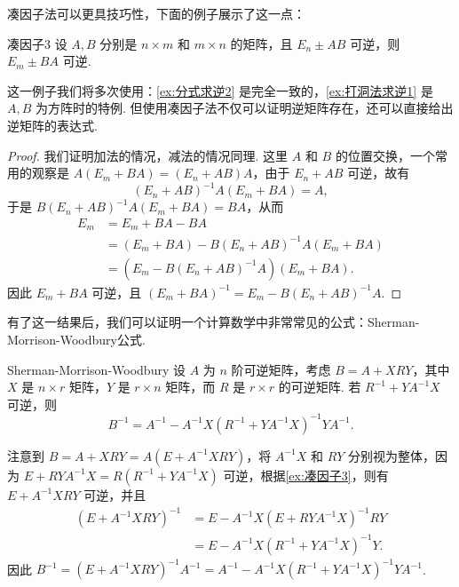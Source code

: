 凑因子法可以更具技巧性，下面的例子展示了这一点：

\begin{example}{}{凑因子3}
    设 $A, B$ 分别是 $n \times m$ 和 $m \times n$ 的矩阵，且 $E_n \pm AB$ 可逆，则 $E_m \pm BA$ 可逆.
\end{example}

这一例子我们将多次使用：\autoref{ex:分式求逆2} 是完全一致的，\autoref{ex:打洞法求逆1} 是 $A,B$ 为方阵时的特例. 但使用凑因子法不仅可以证明逆矩阵存在，还可以直接给出逆矩阵的表达式.

\begin{proof}
    我们证明加法的情况，减法的情况同理. 这里 $A$ 和 $B$ 的位置交换，一个常用的观察是 $A(E_m + BA) = (E_n + AB)A$，由于 $E_n + AB$ 可逆，故有
    \[(E_n + AB)^{-1}A(E_m + BA) = A,\]
    于是 $B(E_n + AB)^{-1}A(E_m + BA) = BA$，从而
    \begin{align*}
        E_m &= E_m + BA - BA \\
           & = (E_m + BA) - B(E_n + AB)^{-1}A(E_m + BA) \\
           & = (E_m - B(E_n + AB)^{-1}A)(E_m + BA).
    \end{align*}
    因此 $E_m + BA$ 可逆，且 $(E_m + BA)^{-1} = E_m - B(E_n + AB)^{-1}A$.
\end{proof}

有了这一结果后，我们可以证明一个计算数学中非常常见的公式：Sherman-Morrison-Woodbury公式.
\begin{example}{}{Sherman-Morrison-Woodbury}
    设 $A$ 为 $n$ 阶可逆矩阵，考虑 $B = A + XRY$，其中 $X$ 是 $n \times r$ 矩阵，$Y$ 是 $r \times n$ 矩阵，而 $R$ 是 $r \times r$ 的可逆矩阵. 若 $R^{-1} + YA^{-1}X$ 可逆，则
    \[B^{-1}=A^{-1}-A^{-1}X(R^{-1}+YA^{-1}X)^{-1}YA^{-1}.\]
\end{example}

\begin{solution}
    注意到 $B = A + XRY = A(E + A^{-1}XRY)$，将 $A^{-1}X$ 和 $RY$ 分别视为整体，因为 $E + RYA^{-1}X = R(R^{-1} + YA^{-1}X)$ 可逆，根据\autoref{ex:凑因子3}，则有 $E + A^{-1}XRY$ 可逆，并且
    \begin{align*}
        (E + A^{-1}XRY)^{-1} & = E - A^{-1}X(E + RYA^{-1}X)^{-1}RY \\
                             & = E - A^{-1}X(R^{-1} + YA^{-1}X)^{-1}Y.
    \end{align*}
    因此 $B^{-1} = (E + A^{-1}XRY)^{-1}A^{-1} = A^{-1} - A^{-1}X(R^{-1} + YA^{-1}X)^{-1}YA^{-1}$.
\end{solution}

